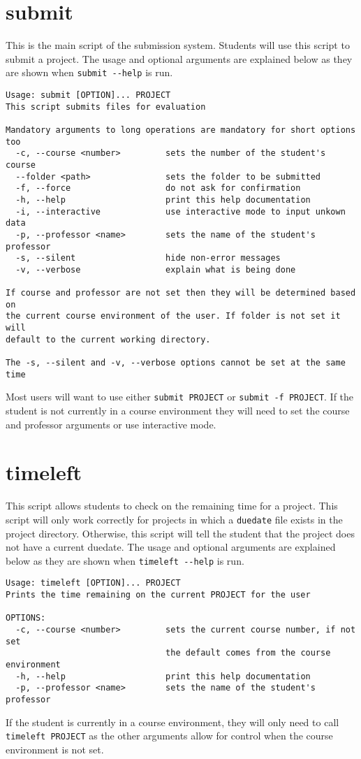 \documentclass{article}
\begin{document}
\section{submit}
This is the main script of the submission system. Students will use this script to submit a project.
The usage and optional arguments are explained below as they are shown when \verb|submit --help| is run.
\begin{verbatim}
Usage: submit [OPTION]... PROJECT
This script submits files for evaluation

Mandatory arguments to long operations are mandatory for short options too
  -c, --course <number>         sets the number of the student's course
  --folder <path>               sets the folder to be submitted
  -f, --force                   do not ask for confirmation
  -h, --help                    print this help documentation
  -i, --interactive             use interactive mode to input unkown data
  -p, --professor <name>        sets the name of the student's professor
  -s, --silent                  hide non-error messages
  -v, --verbose                 explain what is being done

If course and professor are not set then they will be determined based on
the current course environment of the user. If folder is not set it will
default to the current working directory.

The -s, --silent and -v, --verbose options cannot be set at the same time
\end{verbatim}
Most users will want to use either \verb|submit PROJECT| or \verb|submit -f PROJECT|. If the student is not currently in a course environment they will need to set the course and professor arguments or use interactive mode.

\section{timeleft}
This script allows students to check on the remaining time for a project. This script will only work correctly for projects in which a \verb|duedate| file exists in the project directory. Otherwise, this script will tell the student that the project does not have a current duedate. The usage and optional arguments are explained below as they are shown when \verb|timeleft --help| is run.
\begin{verbatim}
Usage: timeleft [OPTION]... PROJECT
Prints the time remaining on the current PROJECT for the user

OPTIONS:
  -c, --course <number>         sets the current course number, if not set
                                the default comes from the course environment
  -h, --help                    print this help documentation
  -p, --professor <name>        sets the name of the student's professor
\end{verbatim}
If the student is currently in a course environment, they will only need to call \verb|timeleft PROJECT| as the other arguments allow for control when the course environment is not set.
\end{document}
